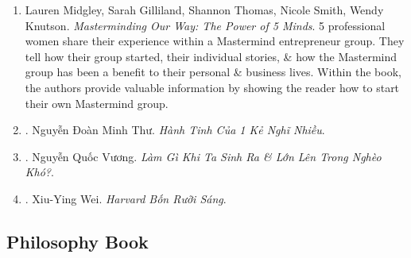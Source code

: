 \documentclass{article}
\begin{document}
\begin{enumerate}
	What is financial abuse? Has your spouse or parent taken out lines of credit in your name without your consent? Does your ex-spouse suddenly stop paying child support as a means of furthering their abuse \& control over your life? Has your partner moved money from your joint account to a secret individual account without your prior knowledge or consent? Do your parents use financial gifts as an open door to demand future compliance on your part? Are you blamed for creating financial stress but are not the one who overspends? Did your ex-spouse hide his or her income from being included in the calculations for child \&{\tt/}or spousal support? Have your religious leaders said that you must give to the church 1st, even if that means you cannot provide for your household's basic needs? Do you carry the full burden of making enough money for your household because your partner refuses to maintain steady employment?

	\item {\sc Lauren Midgley, Sarah Gilliland, Shannon Thomas, Nicole Smith, Wendy Knutson}. {\it Masterminding Our Way: The Power of 5 Minds}. 5 professional women share their experience within a Mastermind entrepreneur group. They tell how their group started, their individual stories, \& how the Mastermind group has been a benefit to their personal \& business lives. Within the book, the authors provide valuable information by showing the reader how to start their own Mastermind group. {}

	\item \cite{Thu_overthink}. {\sc Nguyễn Đoàn Minh Thư}. {\it Hành Tinh Của 1  Kẻ Nghĩ Nhiều}.\hfill{\sf[done]}

	\item \cite{Vuong_born_poor}. {\sc Nguyễn Quốc Vương}. {\it Làm Gì Khi Ta Sinh Ra \& Lớn Lên Trong Nghèo Khó?}.\hfill{\sf[done]}

	\item \cite{Wei_Harvard_VN}. {\sc Xiu-Ying Wei}. {\it Harvard Bốn Rưỡi Sáng}.\hfill{\sf[done]}
\end{enumerate}


\subsection{Philosophy Book}
\end{document}
